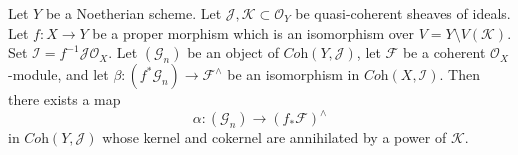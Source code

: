\begin{lemma}
\label{lemma-inverse-systems-push-pull}
Let $Y$ be a Noetherian scheme. Let
$\mathcal{J}, \mathcal{K} \subset \mathcal{O}_Y$
be quasi-coherent sheaves of ideals.
Let $f : X \to Y$ be a proper morphism which is an isomorphism
over $V = Y \setminus V(\mathcal{K})$.
Set $\mathcal{I} = f^{-1}\mathcal{J} \mathcal{O}_X$.
Let $(\mathcal{G}_n)$ be an object of $\textit{Coh}(Y, \mathcal{J})$,
let $\mathcal{F}$ be a coherent $\mathcal{O}_X$-module, and let
$\beta : (f^*\mathcal{G}_n)  \to \mathcal{F}^\wedge$ be an isomorphism in
$\textit{Coh}(X, \mathcal{I})$. Then there exists a map
$$
\alpha :
(\mathcal{G}_n)
\longrightarrow
(f_*\mathcal{F})^\wedge
$$
in $\textit{Coh}(Y, \mathcal{J})$ whose kernel and cokernel
are annihilated by a power of $\mathcal{K}$.
\end{lemma}

